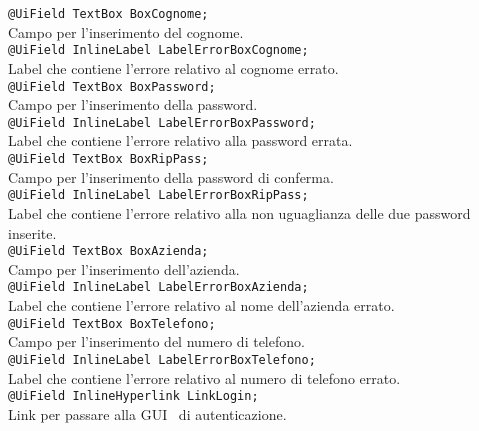 {\begin{sloppypar}
{\begin{itemize}
\begin{itemize}
				\texttt{@UiField TextBox BoxCognome;}\\
				Campo per l'inserimento del cognome.\\
				
				\texttt{@UiField InlineLabel LabelErrorBoxCognome;}\\
				Label che contiene l’errore relativo al cognome errato.\\

				\texttt{@UiField TextBox BoxPassword;}\\
				Campo per l'inserimento della password.\\
				
				\texttt{@UiField InlineLabel LabelErrorBoxPassword;}\\
				Label che contiene l’errore relativo alla password errata.\\
				
				\texttt{@UiField TextBox BoxRipPass;}\\
				Campo per l'inserimento della password di conferma.\\
				
				\texttt{@UiField InlineLabel LabelErrorBoxRipPass;}\\
				Label che contiene l’errore relativo alla non uguaglianza delle due password inserite.\\
				
				\texttt{@UiField TextBox BoxAzienda;}\\
				Campo per l'inserimento dell'azienda.\\
				
				\texttt{@UiField InlineLabel LabelErrorBoxAzienda;}\\
				Label che contiene l’errore relativo al nome dell'azienda errato.\\
				
				\texttt{@UiField TextBox BoxTelefono;}\\
				Campo per l'inserimento del numero di telefono.\\
				
				\texttt{@UiField InlineLabel LabelErrorBoxTelefono;}\\
				Label che contiene l’errore relativo al numero di telefono errato.\\
				
				\texttt{@UiField InlineHyperlink LinkLogin;}\\
				Link per passare alla GUI\g~ di autenticazione.\\
				

\end{itemize}
\end{itemize}}
\end{sloppypar}}
